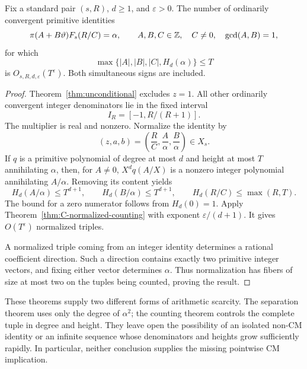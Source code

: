 \begin{theorem}
\label{thm:C-primitive-counting}
Fix a standard pair $(s,R)$, $d\geq1$, and $\varepsilon>0$.  The number
of ordinarily convergent primitive identities
\[
 \pi(A+B\vartheta)F_s(R/C)=\alpha,\qquad
 A,B,C\in\mathbb Z,\quad C\ne0,\quad\gcd(A,B)=1,
\]
for which
\[
                  \max\{|A|,|B|,|C|,H_d(\alpha)\}\leq T
\]
is $O_{s,R,d,\varepsilon}(T^\varepsilon)$.  Both simultaneous signs
are included.
\end{theorem}
\begin{proof}
Theorem~\ref{thm:unconditional} excludes $z=1$.  All other ordinarily
convergent integer denominators lie in the fixed interval
\[
                         I_R=[-1,R/(R+1)].
\]
The multiplier is real and nonzero.  Normalize the identity by
\[
                 (z,a,b)=\left(\frac RC,\frac A\alpha,
                                                \frac B\alpha\right)
                 \in X_s.
\]
If $q$ is a primitive polynomial of degree at most $d$ and height at
most $T$ annihilating $\alpha$, then, for $A\ne0$,
$X^d q(A/X)$ is a nonzero integer polynomial annihilating $A/\alpha$.
Removing its content yields
\[
 H_d(A/\alpha)\leq T^{d+1},\qquad
 H_d(B/\alpha)\leq T^{d+1},\qquad
 H_d(R/C)\leq\max(R,T).
\]
The bound for a zero numerator follows from $H_d(0)=1$.  Apply
Theorem~\ref{thm:C-normalized-counting} with exponent
$\varepsilon/(d+1)$.  It gives $O(T^\varepsilon)$ normalized triples.

A normalized triple coming from an integer identity determines a
rational coefficient direction.  Such a direction contains exactly
two primitive integer vectors, and fixing either vector determines $\alpha$.
Thus normalization has fibers of size at most two on the tuples being
counted, proving the result.
\end{proof}

These theorems supply two different forms of arithmetic scarcity.
The separation theorem uses only the degree of $\alpha^2$; the
counting theorem controls the complete tuple in degree and height.
They leave open the possibility of an isolated non-CM identity or an
infinite sequence whose denominators and heights grow sufficiently
rapidly.  In particular, neither conclusion supplies the missing
pointwise CM implication.
